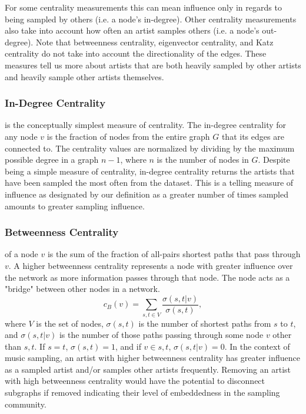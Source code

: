 \documentclass[pageno]{jpaper}
\begin{document}
For some centrality measurements this can mean influence only in regards to being sampled by others (i.e. a node's in-degree). Other centrality measurements also take into account how often an artist samples others (i.e. a node's out-degree). Note that betweenness centrality, eigenvector centrality, and Katz centrality do not take into account the directionality of the edges. These measures tell us more about artists that are both heavily sampled by other artists and heavily sample other artists themselves. 
\subsubsection{In-Degree Centrality}
is the conceptually simplest measure of centrality. The in-degree centrality for any node $v$ is the fraction of nodes from the entire graph $G$ that its edges are connected to. The centrality values are normalized by dividing by the maximum possible degree in a graph $n-1$, where $n$ is the number of nodes in $G$. Despite being a simple measure of centrality, in-degree centrality returns the artists that have been sampled the most often from the dataset. This is a telling measure of influence as designated by our definition as a greater number of times sampled amounts to greater sampling influence.
\subsubsection{Betweenness Centrality}
of a node $v$ is the sum of the fraction of all-pairs shortest paths that pass through $v$. A higher betweenness centrality represents a node with greater influence over the network as more information passes through that node. The node acts as a "bridge" between other nodes in a network.
\begin{equation}
c_B(v) =\sum_{s,t \in V} \frac{\sigma(s, t|v)}{\sigma(s, t)},
\end{equation}
where $V$ is the set of nodes, $\sigma(s,t)$ is the number of shortest paths from $s$ to $t$, and $\sigma(s,t|v)$ is the number of those paths passing through some node $v$ other than $s,t$. If $s=t$, $\sigma(s,t)=1$, and if $v\in s,t$, $\sigma(s,t|v)=0$. In the context of music sampling, an artist with higher betweenness centrality has greater influence as a sampled artist and/or samples other artists frequently. Removing an artist with high betweenness centrality would have the potential to disconnect subgraphs if removed indicating their level of embeddedness in the sampling community.
\end{document}
